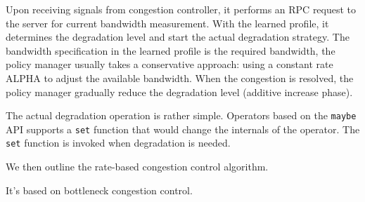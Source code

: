  Upon receiving signals from congestion controller, it
performs an RPC request to the server for current bandwidth measurement. With
the learned profile, it determines the degradation level and start the actual
degradation strategy. The bandwidth specification in the learned profile is the
required bandwidth, the policy manager usually takes a conservative approach:
using a constant rate ALPHA to adjust the available bandwidth. When the
congestion is resolved, the policy manager gradually reduce the degradation
level (additive increase phase).

 The actual degradation operation is rather simple. Operators
based on the \texttt{maybe} API supports a \texttt{set} function that would
change the internals of the operator. The \texttt{set} function is invoked when
degradation is needed.

We then outline the rate-based congestion control algorithm.

It's based on bottleneck congestion control.

